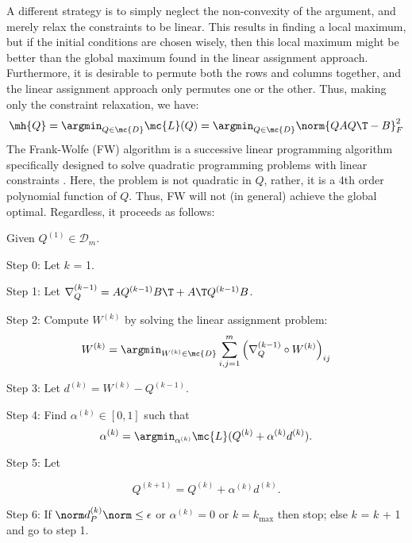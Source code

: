 A different strategy is to simply neglect the non-convexity of the argument, and merely relax the constraints to be linear.  This results in finding a local maximum, but if the initial conditions are chosen wisely, then this local maximum might be better than the global maximum found in the linear assignment approach.  Furthermore, it is desirable to permute both the rows and columns together, and the linear assignment approach only permutes one or the other.  Thus, making only the constraint relaxation, we have:
\begin{align} \label{eq:D}
	\mh{Q} = \argmin_{Q \in \mc{D}} \mc{L}(Q) = \argmin_{Q \in \mc{D}} \norm{Q A Q\T - B}_F^2 
\end{align}
The Frank-Wolfe (FW) algorithm is a successive linear programming algorithm specifically designed to solve quadratic programming problems with linear constraints \cite{??}.  Here, the problem is not quadratic in $Q$, rather, it is a 4th order polynomial function of $Q$.  Thus, FW will not (in general) achieve the global optimal.  Regardless, it proceeds as follows:
\begin{Alg}
Given $ Q^{(1)} \in \mathcal D_m $.
\item {Step 0:} Let $k$ = 1.

\item {Step 1:} Let $\nabla_Q^{(k-1)} = A Q^{(k-1)} B\T + A\T Q^{(k-1)} B$.  

\item {Step 2:} Compute $W^{(k)}$  by solving the
linear assignment problem:
\begin{align}
	W^{(k)} = \argmin_{W^{(k)} \in \mc{D}} %
	\sum_{i,j=1}^m 
	\left( 
	\nabla_Q^{(k-1)}\circ W^{(k)}
	 \right)_{ij}
\end{align}
\item {Step 3:} Let $d^{(k)} = W^{(k)} - Q^{(k-1)}. $
\item {Step 4:} Find $\alpha^{(k)} \in [0,1]$ such that
$$\alpha^{(k)}=\argmin_{\alpha^{(k)}}
\mc{L} (Q^{(k)} + \alpha^{(k)} d^{(k)}).
$$
\item {Step 5:} Let

$$ Q^{(k+1)} = Q^{(k)} + \alpha^{(k)} d^{(k)}. $$
\item {Step 6:} 
If $\norm d^{(k)}_{P} \norm \le \epsilon$ or $\alpha^{(k)}=0$ or $k=k_{\max}$
then stop; else $k$ = $k$ + 1 and go to step 1.
\end{Alg}



